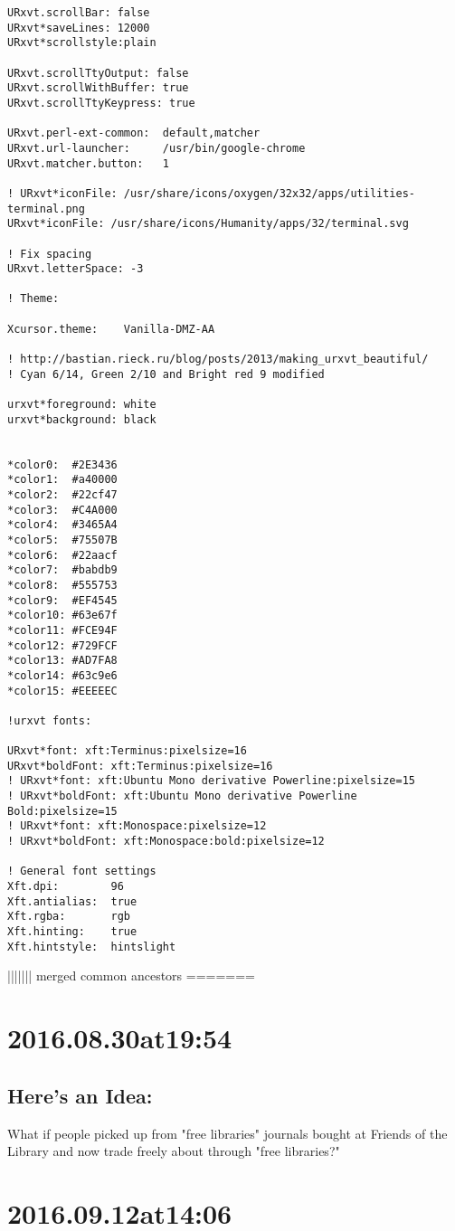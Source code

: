 \begin{enumerate}
\begin{enumerate}
\begin{lstlisting}
URxvt.scrollBar: false
URxvt*saveLines: 12000
URxvt*scrollstyle:plain

URxvt.scrollTtyOutput: false
URxvt.scrollWithBuffer: true
URxvt.scrollTtyKeypress: true

URxvt.perl-ext-common:  default,matcher
URxvt.url-launcher:     /usr/bin/google-chrome
URxvt.matcher.button:   1

! URxvt*iconFile: /usr/share/icons/oxygen/32x32/apps/utilities-terminal.png
URxvt*iconFile: /usr/share/icons/Humanity/apps/32/terminal.svg

! Fix spacing
URxvt.letterSpace: -3

! Theme:

Xcursor.theme:    Vanilla-DMZ-AA

! http://bastian.rieck.ru/blog/posts/2013/making_urxvt_beautiful/
! Cyan 6/14, Green 2/10 and Bright red 9 modified

urxvt*foreground: white
urxvt*background: black


*color0:  #2E3436
*color1:  #a40000
*color2:  #22cf47
*color3:  #C4A000
*color4:  #3465A4
*color5:  #75507B
*color6:  #22aacf
*color7:  #babdb9
*color8:  #555753
*color9:  #EF4545
*color10: #63e67f
*color11: #FCE94F
*color12: #729FCF
*color13: #AD7FA8
*color14: #63c9e6
*color15: #EEEEEC

!urxvt fonts: 

URxvt*font: xft:Terminus:pixelsize=16
URxvt*boldFont: xft:Terminus:pixelsize=16
! URxvt*font: xft:Ubuntu Mono derivative Powerline:pixelsize=15
! URxvt*boldFont: xft:Ubuntu Mono derivative Powerline Bold:pixelsize=15
! URxvt*font: xft:Monospace:pixelsize=12
! URxvt*boldFont: xft:Monospace:bold:pixelsize=12

! General font settings
Xft.dpi:        96
Xft.antialias:  true
Xft.rgba:       rgb
Xft.hinting:    true
Xft.hintstyle:  hintslight
\end{lstlisting}
||||||| merged common ancestors
=======

\section*{ 2016.08.30at19:54 }
\subsection*{Here's an Idea:}
What if people picked up from "free libraries" journals bought at Friends of the Library and now trade freely about through "free libraries?"

\section*{ 2016.09.12at14:06 }

\end{enumerate}
\end{enumerate}
